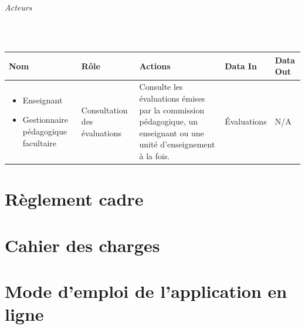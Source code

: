 \documentclass[a4paper,11pt]{report}
\begin{document}
\paragraph{Acteurs}~\newline{}

\begin{tabularx}{\linewidth}{|X|X|X|X|X|} \hline
Nom & Rôle & Actions & Data In & Data Out \\ \hline 
\begin{itemize}
	\item Enseignant
	\item Gestionnaire pédagogique facultaire
\end{itemize}
& Consultation des évaluations & Consulte les évaluations émises par la commission pédagogique, un enseignant ou une unité d'enseignement à la fois. & Évaluations & N/A \\ \hline
\end{tabularx}




\appendix
\renewcommand{\partname}{Annexe}
\setcounter{part}{0}%
\part{Règlement cadre}\label{an:regl-cadre}


\part{Cahier des charges}\label{an:cachier-charges}


\part{Mode d'emploi de l'application en ligne}\label{an:mode-emploi}

\end{document}
